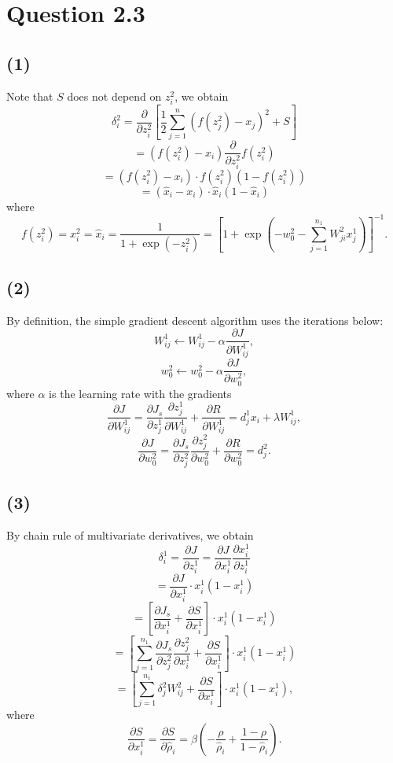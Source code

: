 \documentclass{article}
\begin{document}
\section*{Question 2.3}
{
    \subsection*{(1)}
    {
        Note that $S$ does not depend on $z_i^2$, we obtain
        $$\delta_i^2 = \frac{\partial}{\partial z_i^2} {\left[ \frac{1}{2} \sum_{j=1}^{n}{(f(z_j^2) - x_j)^2} + S \right]} $$
        $$= (f(z_i^2) - x_i) \frac{\partial}{\partial z_i^2} {f(z_i^2)} $$
        $$= (f(z_i^2) - x_i) \cdot f(z_i^2) (1 - f(z_i^2))$$
        $$= (\hat{x}_i - x_i) \cdot \hat{x}_i (1 - \hat{x}_i)$$ 
        where $$f(z_i^2) = x_i^2 = \hat{x}_i = \frac{1}{1 + \exp{(-z_i^2)}} = \left[ 1 + \exp{(- w_0^2 - \sum_{j=1}^{n_1}{W_{ji}^2 x_j^1})} \right]^{-1}.$$
    }

    \subsection*{(2)}
    {
        By definition, the simple gradient descent algorithm uses the iterations below:
        $$W_{ij}^1 \leftarrow W_{ij}^1 - \alpha \frac{\partial J}{\partial W_{ij}^1},$$
        $$w_0^2 \leftarrow w_0^2 - \alpha \frac{\partial J}{\partial w_0^2},$$
        where $\alpha$ is the learning rate with the gradients 
        $$\frac{\partial J}{\partial W_{ij}^1} = \frac{\partial J_s}{\partial z_j^1} \frac{\partial z_j^1}{\partial W_{ij}^1} + \frac{\partial R}{\partial W_{ij}^1} = d_j^1 x_i + \lambda W_{ij}^1,$$
        $$\frac{\partial J}{\partial w_0^2} = \frac{\partial J_s}{\partial z_j^2} \frac{\partial z_j^2}{\partial w_0^2} + \frac{\partial R}{\partial w_0^2} = d_j^2.$$
    }

    \subsection*{(3)}
    {
        By chain rule of multivariate derivatives, we obtain
        $$\delta_i^1 = \frac{\partial J}{\partial z_i^1} = \frac{\partial J}{\partial x_i^1} \frac{\partial x_i^1}{\partial z_i^1}$$
        $$= \frac{\partial J}{\partial x_i^1} \cdot x_i^1 (1 - x_i^1)$$
        $$= \left[ \frac{\partial J_s}{\partial x_i^1} + \frac{\partial S}{\partial x_i^1} \right] \cdot x_i^1 (1 - x_i^1)$$
        $$= \left[ \sum_{j=1}^{n_1}{\frac{\partial J_s}{\partial z_j^2} \frac{\partial z_j^2}{\partial x_i^1}} + \frac{\partial S}{\partial x_i^1} \right] \cdot x_i^1 (1 - x_i^1)$$
        $$= \left[ \sum_{j=1}^{n_1}{\delta_j^2 W_{ij}^2} + \frac{\partial S}{\partial x_i^1} \right] \cdot x_i^1 (1 - x_i^1),$$
        where $$\frac{\partial S}{\partial x_i^1} = \frac{\partial S}{\partial \hat{\rho}_i} = \beta \left( -\frac{\rho}{\hat{\rho}_i} + \frac{1 - \rho}{1 - \hat{\rho}_i} \right).$$
    }
}
\end{document}
